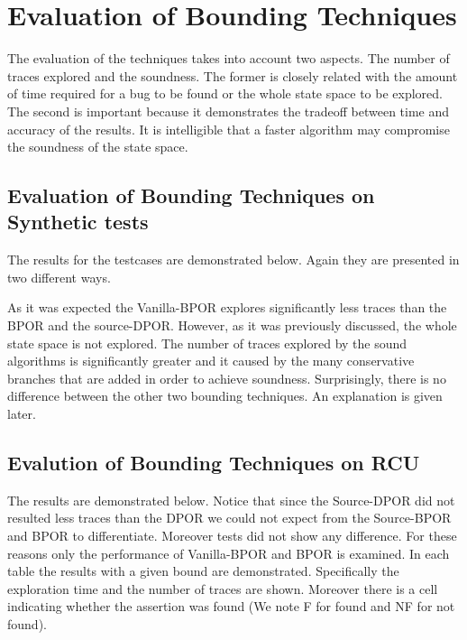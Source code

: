 \section{Evaluation of Bounding Techniques}
The evaluation of the techniques takes into account two aspects. The number of traces explored and the soundness. The former is closely related with the amount
of time required for a bug to be found or the whole state space to be explored. The second is important because it demonstrates the tradeoff between time and accuracy
of the results. It is intelligible that a faster algorithm may compromise the soundness of the state space.
\subsection{Evaluation of Bounding Techniques on Synthetic tests}

The results for the testcases are demonstrated below. Again they are presented in two different ways.


As it was expected the Vanilla-BPOR explores significantly less traces than the BPOR and the source-DPOR. However, as it was previously discussed, the whole
state space is not explored. The number of traces explored by the sound algorithms is significantly greater and it caused by the many conservative branches that are
added in order to achieve soundness. Surprisingly, there is no difference between the other two bounding techniques. An explanation is given later.

\subsection{Evalution of Bounding Techniques on RCU}
The results are demonstrated below. Notice that since the Source-DPOR did not resulted less traces than the DPOR we could not expect from the Source-BPOR and BPOR
to differentiate. Moreover tests did not show any difference. For these reasons only the performance of Vanilla-BPOR and BPOR is examined. In each table
the results with a given bound are demonstrated. Specifically the exploration time and the number of traces are shown. 
Moreover there is a cell indicating whether the assertion was found (We note F for found and NF for not found).


